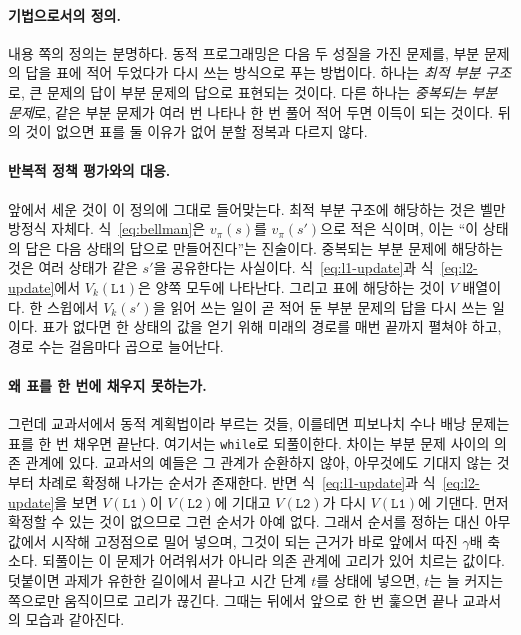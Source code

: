 \documentclass[11pt,a4paper]{article}
\newcommand{\Lone}{\texttt{L1}}
\newcommand{\Ltwo}{\texttt{L2}}
\begin{document}
\paragraph{기법으로서의 정의.}
내용 쪽의 정의는 분명하다. 동적 프로그래밍은 다음 두 성질을 가진 문제를, 부분 문제의 답을 표에 적어
두었다가 다시 쓰는 방식으로 푸는 방법이다. 하나는 \emph{최적 부분 구조}로, 큰 문제의 답이 부분 문제의
답으로 표현되는 것이다. 다른 하나는 \emph{중복되는 부분 문제}로, 같은 부분 문제가 여러 번 나타나 한 번
풀어 적어 두면 이득이 되는 것이다. 뒤의 것이 없으면 표를 둘 이유가 없어 분할 정복과 다르지 않다.

\paragraph{반복적 정책 평가와의 대응.}
앞에서 세운 것이 이 정의에 그대로 들어맞는다. 최적 부분 구조에 해당하는 것은 벨만 방정식 자체다.
식~\eqref{eq:bellman}은 $v_\pi(s)$를 $v_\pi(s')$으로 적은 식이며, 이는 ``이 상태의 답은 다음 상태의
답으로 만들어진다''는 진술이다. 중복되는 부분 문제에 해당하는 것은 여러 상태가 같은 $s'$을 공유한다는
사실이다. 식~\eqref{eq:l1-update}과 식~\eqref{eq:l2-update}에서 $V_k(\Lone)$은 양쪽 모두에 나타난다.
그리고 표에 해당하는 것이 $V$ 배열이다. 한 스윕에서 $V_k(s')$을 읽어 쓰는 일이 곧 적어 둔 부분 문제의
답을 다시 쓰는 일이다. 표가 없다면 한 상태의 값을 얻기 위해 미래의 경로를 매번 끝까지 펼쳐야 하고,
경로 수는 걸음마다 곱으로 늘어난다.

\paragraph{왜 표를 한 번에 채우지 못하는가.}
그런데 교과서에서 동적 계획법이라 부르는 것들, 이를테면 피보나치 수나 배낭 문제는 표를 한 번 채우면
끝난다. 여기서는 \lstinline|while|로 되풀이한다. 차이는 부분 문제 사이의 의존 관계에 있다. 교과서의
예들은 그 관계가 순환하지 않아, 아무것에도 기대지 않는 것부터 차례로 확정해 나가는 순서가 존재한다.
반면 식~\eqref{eq:l1-update}과 식~\eqref{eq:l2-update}을 보면 $V(\Lone)$이 $V(\Ltwo)$에 기대고
$V(\Ltwo)$가 다시 $V(\Lone)$에 기댄다. 먼저 확정할 수 있는 것이 없으므로 그런 순서가 아예 없다. 그래서
순서를 정하는 대신 아무 값에서 시작해 고정점으로 밀어 넣으며, 그것이 되는 근거가 바로 앞에서 따진
$\gamma$배 축소다. 되풀이는 이 문제가 어려워서가 아니라 의존 관계에 고리가 있어 치르는 값이다.
덧붙이면 과제가 유한한 길이에서 끝나고 시간 단계 $t$를 상태에 넣으면, $t$는 늘 커지는 쪽으로만
움직이므로 고리가 끊긴다. 그때는 뒤에서 앞으로 한 번 훑으면 끝나 교과서의 모습과 같아진다.
\end{document}
